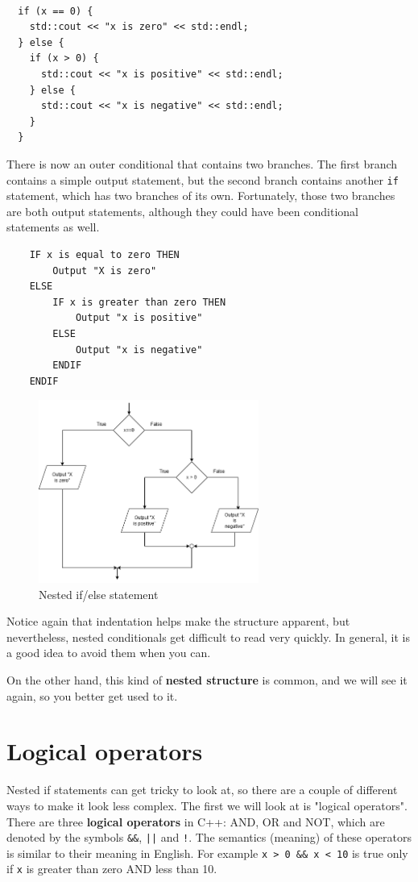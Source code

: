 \begin{lstlisting}
  
  if (x == 0) {
    std::cout << "x is zero" << std::endl;
  } else {
    if (x > 0) {
      std::cout << "x is positive" << std::endl;
    } else {
      std::cout << "x is negative" << std::endl;
    }
  }
\end{lstlisting}
%
There is now an outer conditional that contains two branches.  The
first branch contains a simple output statement, but the second
branch contains another {\tt if} statement, which has two branches
of its own.  Fortunately, those two branches are both output
statements, although they could have been conditional statements as
well.
\begin{verbatim}
    IF x is equal to zero THEN
        Output "X is zero"
    ELSE 
        IF x is greater than zero THEN
            Output "x is positive"
        ELSE 
            Output "x is negative"
        ENDIF
    ENDIF
\end{verbatim}
\begin{figure}[h]
    \centering
    \includegraphics[height=6cm]{images/nestedifflow.png}
    \caption{Nested if/else statement}
    \label{fig:nestedifelse}
\end{figure}
Notice again that indentation helps make the structure
apparent, but nevertheless, nested conditionals get difficult to read
very quickly.  In general, it is a good idea to avoid them when you
can.


On the other hand, this kind of {\bf nested structure} is common, and
we will see it again, so you better get used to it.

\section{Logical operators}
Nested if statements can get tricky to look at, so there are a couple of different ways to make it look less complex. The first we will look at is "logical operators".
There are three {\bf logical operators} in C++: AND, OR and NOT,
which are denoted by the symbols {\tt \&\&}, {\tt ||} and
{\tt !}.  The semantics (meaning) of these operators is similar
to their meaning in English.  For example {\tt x > 0 \&\& x < 10}
is true only if {\tt x} is greater than zero AND less than 10.


